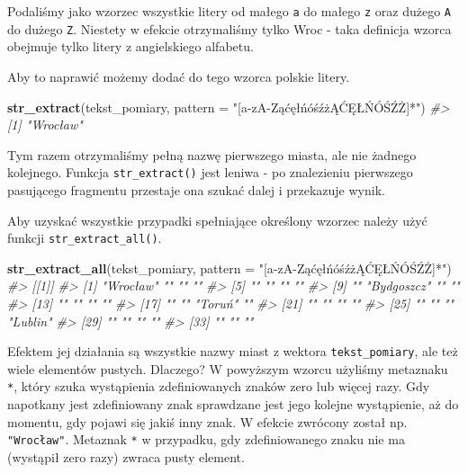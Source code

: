 \documentclass[paper=6in:9in,pagesize=pdftex,headinclude=on,footinclude=on,10pt]{scrbook}
\newenvironment{Shaded}{\begin{snugshade}}{\end{snugshade}}
\newcommand{\CommentTok}[1]{\textcolor[rgb]{0.56,0.35,0.01}{\textit{#1}}}
\newcommand{\DataTypeTok}[1]{\textcolor[rgb]{0.13,0.29,0.53}{#1}}
\newcommand{\KeywordTok}[1]{\textcolor[rgb]{0.13,0.29,0.53}{\textbf{#1}}}
\newcommand{\NormalTok}[1]{#1}
\newcommand{\StringTok}[1]{\textcolor[rgb]{0.31,0.60,0.02}{#1}}
\begin{document}
Podaliśmy jako wzorzec wszystkie litery od małego \texttt{a} do małego \texttt{z} oraz dużego \texttt{A} do dużego \texttt{Z}.
Niestety w efekcie otrzymaliśmy tylko Wroc - taka definicja wzorca obejmuje tylko litery z angielskiego alfabetu.

Aby to naprawić możemy dodać do tego wzorca polskie litery.

\begin{Shaded}
\begin{Highlighting}[]
\KeywordTok{str_extract}\NormalTok{(tekst_pomiary, }\DataTypeTok{pattern =} \StringTok{"[a-zA-ZąćęłńóśźżĄĆĘŁŃÓŚŹŻ]*"}\NormalTok{)}
\CommentTok{#> [1] "Wrocław"}
\end{Highlighting}
\end{Shaded}

Tym razem otrzymaliśmy pełną nazwę pierwszego miasta, ale nie żadnego kolejnego.
Funkcja \texttt{str\_extract()} jest leniwa - po znalezieniu pierwszego pasującego fragmentu przestaje ona szukać dalej i przekazuje wynik.

Aby uzyskać wszystkie przypadki spełniające określony wzorzec należy użyć funkcji \texttt{str\_extract\_all()}.

\begin{Shaded}
\begin{Highlighting}[]
\KeywordTok{str_extract_all}\NormalTok{(tekst_pomiary, }\DataTypeTok{pattern =} \StringTok{"[a-zA-ZąćęłńóśźżĄĆĘŁŃÓŚŹŻ]*"}\NormalTok{)}
\CommentTok{#> [[1]]}
\CommentTok{#>  [1] "Wrocław"   ""          ""          ""         }
\CommentTok{#>  [5] ""          ""          ""          ""         }
\CommentTok{#>  [9] ""          "Bydgoszcz" ""          ""         }
\CommentTok{#> [13] ""          ""          ""          ""         }
\CommentTok{#> [17] ""          ""          "Toruń"     ""         }
\CommentTok{#> [21] ""          ""          ""          ""         }
\CommentTok{#> [25] ""          ""          ""          "Lublin"   }
\CommentTok{#> [29] ""          ""          ""          ""         }
\CommentTok{#> [33] ""          ""          ""}
\end{Highlighting}
\end{Shaded}

Efektem jej działania są wszystkie nazwy miast z wektora \texttt{tekst\_pomiary}, ale też wiele elementów pustych.
Dlaczego?
W powyższym wzorcu użyliśmy metaznaku \texttt{*}, który szuka wystąpienia zdefiniowanych znaków zero lub więcej razy.
Gdy napotkany jest zdefiniowany znak sprawdzane jest jego kolejne wystąpienie, aż do momentu, gdy pojawi się jakiś inny znak.
W efekcie zwrócony został np. \texttt{"Wrocław"}.
Metaznak \texttt{*} w przypadku, gdy zdefiniowanego znaku nie ma (wystąpił zero razy) zwraca pusty element.
\end{document}
